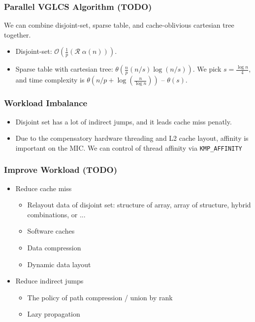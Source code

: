 \begin{frame}
	\frametitle{Parallel VGLCS Algorithm (TODO)}
	We can combine disjoint-set, sparse table, and cache-oblivious cartesian tree together.
	\begin{itemize}
		\setlength\itemsep{1em}
		\item Disjoint-set: $\mathcal{O}(\frac{1}{p}(\mathcal{R} \; \alpha(n)))$.
		\item Sparse table with cartesian tree: $\mathcal{\theta}(\frac{n}{p} (n/s) \log (n/s))$.  
		We pick $s = \frac{\log n}{4}$, and time complexity is $\mathcal{\theta}\left(n/p + \log \left(\frac{n}{\log n}\right)\right)$ -- $\mathcal{\theta}(s)$.
	\end{itemize}
\end{frame}

\begin{frame}
	\frametitle{Workload Imbalance}
	\begin{itemize}
		\setlength\itemsep{1em}
		\item Disjoint set has a lot of indirect jumps, and it leads cache miss penatly.
		\item Due to the compensatory hardware threading and L2 cache layout, affinity 
			is important on the MIC. We can control of thread affinity via \tt{KMP\_AFFINITY}
	\end{itemize}
\end{frame}

\begin{frame}
	\frametitle{Improve Workload (TODO)}
	\begin{itemize}
		\setlength\itemsep{1em}
		\item Reduce cache miss
			\begin{itemize}
			 	\item Relayout data of disjoint set: structure of array, 
			 		array of structure, hybrid combinations, or ...
			 	\item Software caches
			 	\item Data compression
			 	\item Dynamic data layout
			\end{itemize}
		\item Reduce indirect jumps
			\begin{itemize}
				\item The policy of path compression / union by rank
				\item Lazy propagation
			\end{itemize}
	\end{itemize}
\end{frame}

